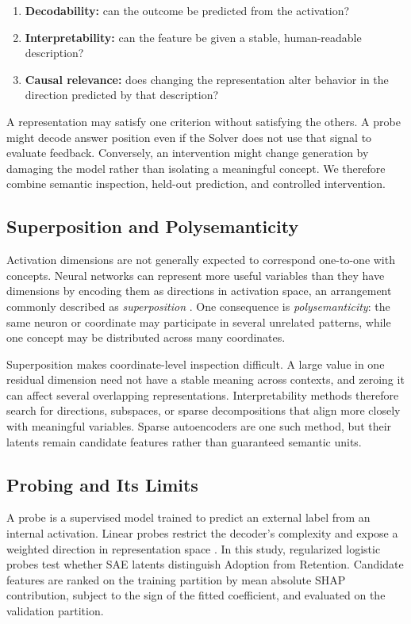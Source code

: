 \begin{enumerate}
    \item \textbf{Decodability:} can the outcome be predicted from the activation?
    \item \textbf{Interpretability:} can the feature be given a stable, human-readable description?
    \item \textbf{Causal relevance:} does changing the representation alter behavior in the direction predicted by that description?
\end{enumerate}

A representation may satisfy one criterion without satisfying the others. A probe might decode answer position even if the Solver does not use that signal to evaluate feedback. Conversely, an intervention might change generation by damaging the model rather than isolating a meaningful concept. We therefore combine semantic inspection, held-out prediction, and controlled intervention.

\subsection{Superposition and Polysemanticity}

Activation dimensions are not generally expected to correspond one-to-one with concepts. Neural networks can represent more useful variables than they have dimensions by encoding them as directions in activation space, an arrangement commonly described as \emph{superposition} \cite{elhage2022superposition}. One consequence is \emph{polysemanticity}: the same neuron or coordinate may participate in several unrelated patterns, while one concept may be distributed across many coordinates.

Superposition makes coordinate-level inspection difficult. A large value in one residual dimension need not have a stable meaning across contexts, and zeroing it can affect several overlapping representations. Interpretability methods therefore search for directions, subspaces, or sparse decompositions that align more closely with meaningful variables. Sparse autoencoders are one such method, but their latents remain candidate features rather than guaranteed semantic units.

\subsection{Probing and Its Limits}

A probe is a supervised model trained to predict an external label from an internal activation. Linear probes restrict the decoder's complexity and expose a weighted direction in representation space \cite{alain2016probes}. In this study, regularized logistic probes test whether SAE latents distinguish Adoption from Retention. Candidate features are ranked on the training partition by mean absolute SHAP contribution, subject to the sign of the fitted coefficient, and evaluated on the validation partition.

